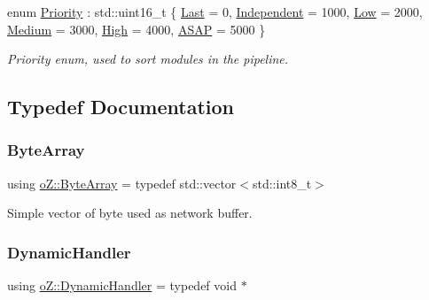 \begin{DoxyCompactItemize}
enum \mbox{\hyperlink{namespaceo_z_af05a92eb185d18369e9b4acdcd9dcd12}{Priority}} \+: std\+::uint16\+\_\+t \{ \newline
\mbox{\hyperlink{namespaceo_z_af05a92eb185d18369e9b4acdcd9dcd12aa71d089139a7dea68f3de0ff29990bff}{Last}} = 0, 
\mbox{\hyperlink{namespaceo_z_af05a92eb185d18369e9b4acdcd9dcd12a0bf10abb7e9da477f36b2e69fdae8745}{Independent}} = 1000, 
\mbox{\hyperlink{namespaceo_z_af05a92eb185d18369e9b4acdcd9dcd12a44acd2d788f9e79eba46abcb3c006b0e}{Low}} = 2000, 
\mbox{\hyperlink{namespaceo_z_af05a92eb185d18369e9b4acdcd9dcd12a4e322bd010e5b70a4c4172c619a7e370}{Medium}} = 3000, 
\newline
\mbox{\hyperlink{namespaceo_z_af05a92eb185d18369e9b4acdcd9dcd12a7f08ba8e8aed8277432e0eba6cf9ffc2}{High}} = 4000, 
\mbox{\hyperlink{namespaceo_z_af05a92eb185d18369e9b4acdcd9dcd12a3e5081e5e70560fee15eb20b87662a69}{A\+S\+AP}} = 5000
 \}
\begin{DoxyCompactList}\small\item\em Priority enum, used to sort modules in the pipeline. \end{DoxyCompactList}\end{DoxyCompactItemize}


\subsection{Typedef Documentation}
\mbox{\label{namespaceo_z_abfa3f5a46e5c7584615dc1dd33fcafb6}} 
\subsubsection{\texorpdfstring{ByteArray}{ByteArray}}
{\footnotesize\ttfamily using \mbox{\hyperlink{namespaceo_z_abfa3f5a46e5c7584615dc1dd33fcafb6}{o\+Z\+::\+Byte\+Array}} = typedef std\+::vector$<$std\+::int8\+\_\+t$>$}



Simple vector of byte used as network buffer. 

\mbox{\label{namespaceo_z_a4f8ae5685d0f7dca498d73129b482f2d}} 
\subsubsection{\texorpdfstring{DynamicHandler}{DynamicHandler}}
{\footnotesize\ttfamily using \mbox{\hyperlink{namespaceo_z_a4f8ae5685d0f7dca498d73129b482f2d}{o\+Z\+::\+Dynamic\+Handler}} = typedef void $\ast$}

